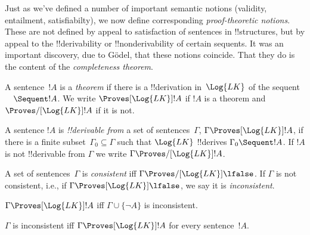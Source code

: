 \documentclass[../../include/open-logic-section]{subfiles}
\begin{document}

\begin{explain}
Just as we've defined a number of important semantic notions
(validity, entailment, satisfiabilty), we now define corresponding
\emph{proof-theoretic notions}. These are not defined by appeal to
satisfaction of sentences in !!{structure}s, but by appeal to the
!!{derivability} or !!{nonderivability} of certain sequents.  It was
an important discovery, due to G\"odel, that these notions coincide.
That they do is the content of the \emph{completeness theorem}.
\end{explain}

\begin{defn}[Theorems]
A sentence~$!A$ is a \emph{theorem} if there is a !!{derivation}
in~$\Log{LK}$ of the sequent $\quad \Sequent !A$. We write
$\Proves[\Log{LK}] !A$ if $!A$ is a theorem and $\Proves/[\Log{LK}]
!A$ if it is not.
\end{defn}

\begin{defn}[Provability]
A sentence $!A$ is \emph{!!{derivable} from} a set of
sentences~$\Gamma$, $\Gamma \Proves[\Log{LK}] !A$, if there is a
finite subset~$\Gamma_0 \subseteq \Gamma$ such that $\Log{LK}$
!!{derive}s $\Gamma_0 \Sequent !A$.  If $!A$ is not !!{derivable} from
$\Gamma$ we write $\Gamma \Proves/[\Log{LK}] !A$.
\end{defn}

\begin{defn}[Consistency]
A set of sentences~$\Gamma$ is \emph{consistent} iff $\Gamma
\Proves/[\Log{LK}] \lfalse$.  If $\Gamma$ is not consistent, i.e., if
$\Gamma \Proves[\Log{LK}] \lfalse$, we say it is \emph{inconsistent}.
\end{defn}

\begin{prop}
$\Gamma \Proves[\Log{LK}] !A$ iff $\Gamma \cup \{\lnot A\}$ is inconsistent.
\end{prop}

\begin{prop}
$\Gamma$ is inconsistent iff $\Gamma \Proves[\Log{LK}] {!A}$ for every
  sentence~$!A$.
\end{prop}
\end{document}
